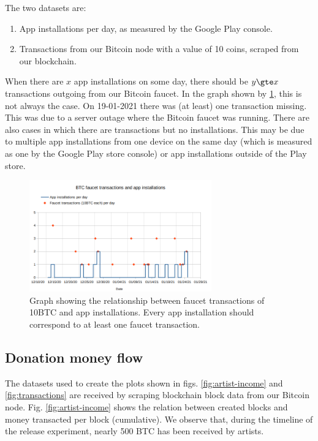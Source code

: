 The two datasets are: 
\begin{enumerate}
    \item App installations per day, as measured by the Google Play console.
    \item Transactions from our Bitcoin node with a value of 10 coins, scraped from our blockchain.
\end{enumerate}

When there are $x$ app installations on some day, there should be $y \gte x$ transactions outgoing from our Bitcoin faucet. In the graph shown by \ref{fig:faucet-app-installs}, this is not always the case. On 19-01-2021 there was (at least) one transaction missing. This was due to a server outage where the Bitcoin faucet was running. There are also cases in which there are transactions but no installations. This may be due to multiple app installations from one device on the same day (which is measured as one by the Google Play store console) or app installations outside of the Play store. 
\begin{figure}
    \centering
    \includegraphics[width=0.7\textwidth]{evaluation/faucet-app-installs.png}
    \caption{Graph showing the relationship between faucet transactions of 10BTC and app installations. Every app installation should correspond to at least one faucet transaction.}
    \label{fig:faucet-app-installs}
\end{figure}

\subsection{Donation money flow}
The datasets used to create the plots shown in figs. \ref{fig:artist-income} and \ref{fig:transactions} are received by scraping blockchain block data from our Bitcoin node. Fig. \ref{fig:artist-income} shows the relation between created blocks and money transacted per block (cumulative). We observe that, during the timeline of the release experiment, nearly 500 BTC has been received by artists.

